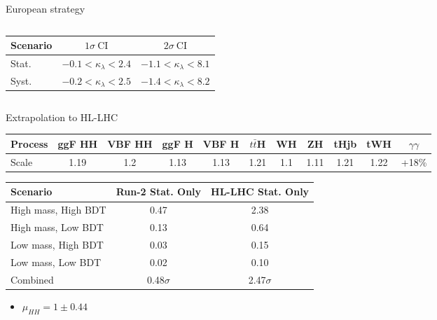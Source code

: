 \begin{frame}{European strategy}
\begin{columns}
\begin{table}[htbp]
    \centering
    \begin{tabular}{lcc}
\hline \hline Scenario & $1 \sigma \ \mathrm{CI}$ & $2 \sigma \ \mathrm{CI}$ \\
\hline Stat. & $-0.1<\kappa_{\lambda}<2.4$ & $-1.1<\kappa_{\lambda}<8.1$ \\
Syst. & $-0.2<\kappa_{\lambda}<2.5$ & $-1.4<\kappa_{\lambda}<8.2$ \\
\hline \hline
\end{tabular}
\end{table}
\end{columns}    
\end{frame}
\begin{frame}{Extrapolation to HL-LHC}
\begin{table}[htbp]
    \centering
    \begin{tabular}{lcccccccccc}
    \hline\hline
    Process & ggF HH & VBF HH & ggF H & VBF H & $t\bar{t}$H & WH & ZH & tHjb & tWH & $\gamma\gamma$\\
    \hline
    Scale & 1.19 & 1.2 & 1.13 & 1.13 & 1.21 & 1.1 & 1.11 & 1.21 & 1.22 & +18\% \\
    \hline\hline
    \end{tabular}
\end{table}

\begin{table}[htbp]
    \centering
    \begin{tabular}{lcc}
    \hline\hline 
        Scenario & Run-2 Stat. Only & HL-LHC Stat. Only \\
    \hline    
        High mass, High BDT & 0.47 & 2.38 \\
        High mass, Low BDT  & 0.13 & 0.64 \\
        Low mass, High BDT  & 0.03 & 0.15 \\
        Low mass, Low BDT   & 0.02 & 0.10 \\
        \hline
        Combined & 0.48$\sigma$ & 2.47$\sigma$ \\
    \hline\hline 
    \end{tabular}
\end{table}

\begin{itemize}
    \item $\mu_{HH} = 1 \pm 0.44$
\end{itemize}

\end{frame}

